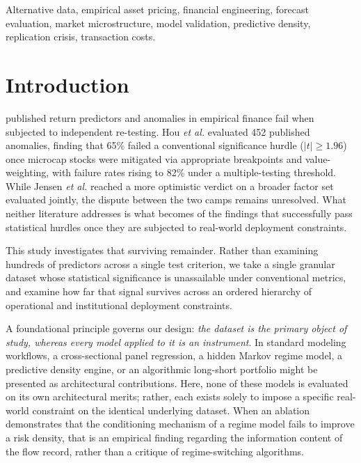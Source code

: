 \documentclass{ieeeaccess}
\begin{document}
\begin{keywords}
Alternative data, empirical asset pricing, financial engineering, forecast evaluation, market microstructure, model validation, predictive density, replication crisis, transaction costs.
\end{keywords}

\titlepgskip=-21pt

\maketitle

\section{Introduction}
\label{sec:introduction}
 published return predictors and anomalies in empirical finance fail when subjected to independent re-testing. Hou \textit{et al.} \cite{hou2020replicating} evaluated 452 published anomalies, finding that 65\% failed a conventional significance hurdle ($|t| \ge 1.96$) once microcap stocks were mitigated via appropriate breakpoints and value-weighting, with failure rates rising to 82\% under a multiple-testing threshold. While Jensen \textit{et al.} \cite{jensen2023there} reached a more optimistic verdict on a broader factor set evaluated jointly, the dispute between the two camps remains unresolved. What neither literature addresses is what becomes of the findings that successfully pass statistical hurdles once they are subjected to real-world deployment constraints.

This study investigates that surviving remainder. Rather than examining hundreds of predictors across a single test criterion, we take a single granular dataset whose statistical significance is unassailable under conventional metrics, and examine how far that signal survives across an ordered hierarchy of operational and institutional deployment constraints.

A foundational principle governs our design: \textit{the dataset is the primary object of study, whereas every model applied to it is an instrument}. In standard modeling workflows, a cross-sectional panel regression, a hidden Markov regime model, a predictive density engine, or an algorithmic long-short portfolio might be presented as architectural contributions. Here, none of these models is evaluated on its own architectural merits; rather, each exists solely to impose a specific real-world constraint on the identical underlying dataset. When an ablation demonstrates that the conditioning mechanism of a regime model fails to improve a risk density, that is an empirical finding regarding the information content of the flow record, rather than a critique of regime-switching algorithms.
\end{document}
